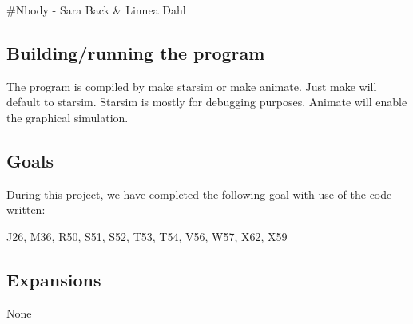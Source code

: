 \#\-Nbody -\/ Sara Back \& Linnea Dahl \subsection*{Building/running the program}

The program is compiled by make starsim or make animate. Just make will default to starsim. Starsim is mostly for debugging purposes. Animate will enable the graphical simulation.

\subsection*{Goals}

During this project, we have completed the following goal with use of the code written\-:

J26, M36, R50, S51, S52, T53, T54, V56, W57, X62, X59

\subsection*{Expansions}

None 
